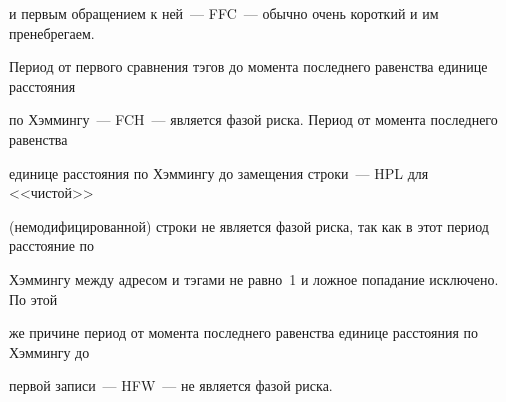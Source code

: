 и  первым обращением к ней~--- FFC~---  обычно очень короткий  и им пренебрегаем. 


Период от первого сравнения тэгов до момента последнего равенства единице расстояния 


по Хэммингу~--- FCH~--- является фазой риска. Период от момента последнего равенства 


единице расстояния по Хэммингу до замещения строки~--- HPL для <<чистой>> 


(немодифицированной) строки не является фазой риска, так как в этот период расстояние по 


Хэммингу между адресом и тэгами не равно~1 и ложное попадание исключено. По этой 


же причине период от момента последнего равенства единице расстояния по Хэммингу до  


первой записи~--- HFW~--- не является фазой риска. 






